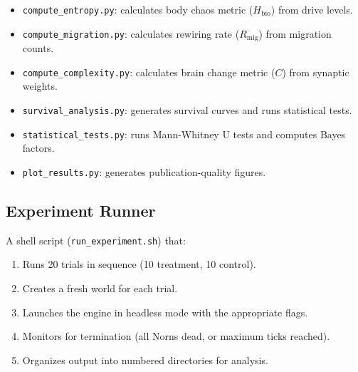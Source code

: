 \documentclass[12pt, a4paper]{article}
\newcommand{\Hbio}{H_{\mathrm{bio}}}
\newcommand{\Rmig}{R_{\mathrm{mig}}}
\begin{document}
\begin{itemize}[nosep]
  \item \texttt{compute\_entropy.py}: calculates body chaos metric ($\Hbio$) from drive levels.
  \item \texttt{compute\_migration.py}: calculates rewiring rate ($\Rmig$) from migration counts.
  \item \texttt{compute\_complexity.py}: calculates brain change metric ($C$) from synaptic weights.
  \item \texttt{survival\_analysis.py}: generates survival curves and runs statistical tests.
  \item \texttt{statistical\_tests.py}: runs Mann-Whitney U tests and computes Bayes factors.
  \item \texttt{plot\_results.py}: generates publication-quality figures.
\end{itemize}

\subsection{Experiment Runner}

A shell script (\texttt{run\_experiment.sh}) that:
\begin{enumerate}[nosep]
  \item Runs 20 trials in sequence (10 treatment, 10 control).
  \item Creates a fresh world for each trial.
  \item Launches the engine in headless mode with the appropriate flags.
  \item Monitors for termination (all Norns dead, or maximum ticks reached).
  \item Organizes output into numbered directories for analysis.
\end{enumerate}



\end{document}
